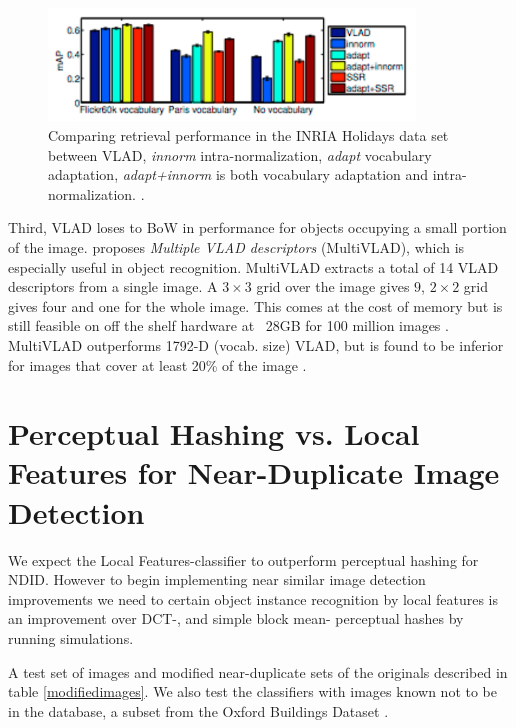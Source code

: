 \documentclass[english,12pt,a4paper,pdftex,elec,utf8, table]{aaltothesis}
\begin{document}
\begin{figure}[htb]
\begin{center}
\includegraphics[height=3cm]{figures/vladadapt}
\end{center}
\caption{Comparing retrieval performance in the INRIA Holidays data set between VLAD, \emph{innorm} intra-normalization, \emph{adapt} vocabulary adaptation, \emph{adapt+innorm} is both vocabulary adaptation and intra-normalization. \cite{Arandjelovic2013}.}
\label{vladadapt}
\end{figure}

Third, VLAD loses to BoW in performance for objects occupying a small portion of the image. \cite{Arandjelovic2013} proposes \emph{Multiple VLAD descriptors} (MultiVLAD), which is especially useful in object recognition. MultiVLAD extracts a total of 14 VLAD descriptors from a single image. A $3 \times 3$ grid over the image gives $9$, $2 \times 2$ grid gives four and one for the whole image. This comes at the cost of memory but is still feasible on off the shelf hardware at ~28GB for 100 million images \cite{Arandjelovic2013}. MultiVLAD outperforms 1792-D (vocab. size) VLAD, but is found to be inferior for images that cover at least 20\% of the image \cite{Arandjelovic2013}.

\clearpage

\section{Perceptual Hashing vs. Local Features for Near-Duplicate Image Detection} \label{mame}
We expect the Local Features-classifier to outperform perceptual hashing for NDID. However to begin implementing near similar image detection improvements we need to certain object instance recognition by local features is an improvement over DCT-, and simple block mean- perceptual hashes by running simulations.

A test set of images and modified near-duplicate sets of the originals described in table \ref{modifiedimages}. We also test the classifiers with images known not to be in the database, a subset from the Oxford Buildings Dataset \cite{PhilbinJamesArandjelovicReljaZisserman2012}.
\end{document}
